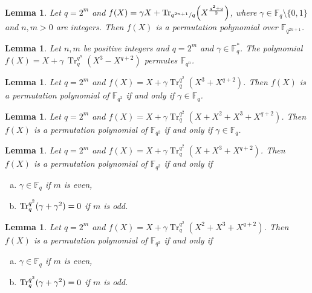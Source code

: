 \documentclass[11pt]{amsart}
\theoremstyle{plain}
\newtheorem{lem}[thm]{Lemma}
\numberwithin{equation}{section}
\theoremstyle{definition}
\def\Tr{{\rm Tr}}
\begin{document}
    \begin{lem}\label{L24}\cite[Theorem 3.5]{LQCL}
Let $q = 2^{m}$ and
$
f(X) = \gamma X + \Tr_{q^{2n+1}/q}\!\left(X^{\frac{q^{2} + q}{2}}\right)$,
where $\gamma \in \mathbb{F}_{q} \setminus \{0,1\}$ and $n, m > 0$ are integers. 
Then $f(X)$ is a permutation polynomial over $\mathbb{F}_{q^{2n+1}}$.
\end{lem}

\begin{lem}\label{L25}\cite[Corollary 1]{ZHZ}
    Let $n,m$ be positive integers and $q=2^m$ and $\gamma\in\mathbb{F}_q^*$. The polynomial
\(
f(X)
=
X+\gamma\,\operatorname{Tr}_{q}^{q^n}\!\left(X^3-X^{q+2}\right)
\)
permutes $\mathbb{F}_{q^n}$.

\end{lem}
\begin{lem}\label{L26}\cite[Theorem 3.1]{JYLQ}
Let $q = 2^m$ and $f(X) = X + \gamma \operatorname{Tr}_{q}^{q^2}(X^3 + X^{q+2})$.
Then $f(X)$ is a permutation polynomial of $\mathbb{F}_{q^2}$ if and only if $\gamma \in \mathbb{F}_q$.
\end{lem}
\begin{lem}\label{L27}\cite[Theorem 3.3]{JYLQ}
Let $q = 2^m$ and $f(X) = X + \gamma \operatorname{Tr}_{q}^{q^2}(X+X^2+X^3 + X^{q+2})$.
Then $f(X)$ is a permutation polynomial of $\mathbb{F}_{q^2}$ if and only if $\gamma \in \mathbb{F}_q$.
\end{lem}
\begin{lem}\label{L28}\cite[Theorem 3.5]{JYLQ}
Let $q = 2^m$ and $f(X) = X + \gamma \operatorname{Tr}_{q}^{q^2}(X+X^3 + X^{q+2})$.
Then $f(X)$ is a permutation polynomial of $\mathbb{F}_{q^2}$ if and only if 
\begin{enumerate}[(a)]
\item $\gamma \in \mathbb{F}_q$ if $m$ is even,
\item $\Tr_{q}^{q^2}(\gamma+\gamma^2)=0$ if $m$ is odd.
\end{enumerate}
\end{lem}
\begin{lem}\label{L29}\cite[Theorem 3.6]{JYLQ}
Let $q = 2^m$ and $f(X) = X + \gamma \operatorname{Tr}_{q}^{q^2}(X^2+X^3 + X^{q+2})$.
Then $f(X)$ is a permutation polynomial of $\mathbb{F}_{q^2}$ if and only if 
\begin{enumerate}[(a)]
\item $\gamma \in \mathbb{F}_q$ if $m$ is even,
\item $\Tr_{q}^{q^2}(\gamma+\gamma^2)=0$ if $m$ is odd.
\end{enumerate}
\end{lem}
\end{document}
